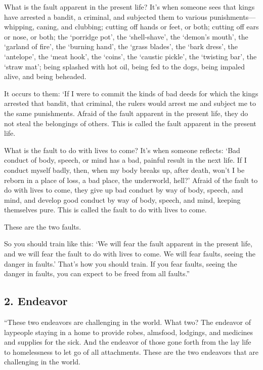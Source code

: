 \documentclass[12pt,openany]{book}%
\begin{document}
What is the fault apparent in the present life? It’s when someone sees that kings have arrested a bandit, a criminal, and subjected them to various punishments—whipping, caning, and clubbing; cutting off hands or feet, or both; cutting off ears or nose, or both; the ‘porridge pot’, the ‘shell-shave’, the ‘demon’s mouth’, the ‘garland of fire’, the ‘burning hand’, the ‘grass blades’, the ‘bark dress’, the ‘antelope’, the ‘meat hook’, the ‘coins’, the ‘caustic pickle’, the ‘twisting bar’, the ‘straw mat’; being splashed with hot oil, being fed to the dogs, being impaled alive, and being beheaded. 

It occurs to them: ‘If I were to commit the kinds of bad deeds for which the kings arrested that bandit, that criminal, the rulers would arrest me and subject me to the same punishments. Afraid of the fault apparent in the present life, they do not steal the belongings of others. This is called the fault apparent in the present life. 

What is the fault to do with lives to come? It’s when someone reflects: ‘Bad conduct of body, speech, or mind has a bad, painful result in the next life. If I conduct myself badly, then, when my body breaks up, after death, won’t I be reborn in a place of loss, a bad place, the underworld, hell?’ Afraid of the fault to do with lives to come, they give up bad conduct by way of body, speech, and mind, and develop good conduct by way of body, speech, and mind, keeping themselves pure. This is called the fault to do with lives to come. 

These are the two faults. 

So you should train like this: ‘We will fear the fault apparent in the present life, and we will fear the fault to do with lives to come. We will fear faults, seeing the danger in faults.’ That’s how you should train. If you fear faults, seeing the danger in faults, you can expect to be freed from all faults.” 

\subsection*{2. Endeavor }

“These two endeavors are challenging in the world. What two? The endeavor of laypeople staying in a home to provide robes, almsfood, lodgings, and medicines and supplies for the sick. And the endeavor of those gone forth from the lay life to homelessness to let go of all attachments. These are the two endeavors that are challenging in the world. 
\end{document}
